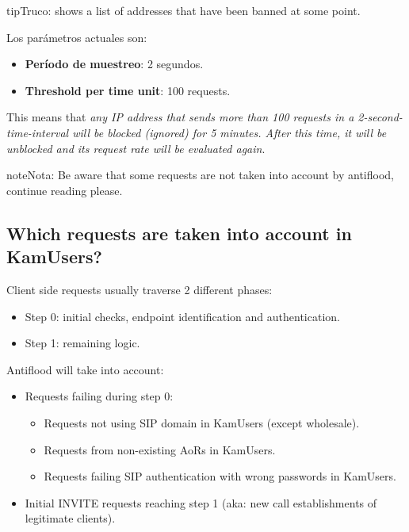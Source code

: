 \documentclass[letterpaper,10pt,spanish]{sphinxmanual}
\begin{document}
\begin{notice}{tip}{Truco:}
{\hyperref[administration_portal/platform/antiflood_banned_ips:antiflood\string-banned\string-ips]{}} shows a list of addresses that have been banned at some point.
\end{notice}

Los parámetros actuales son:
\begin{itemize}
\item {} 
\textbf{Período de muestreo}: 2 segundos.

\item {} 
\textbf{Threshold per time unit}: 100 requests.

\end{itemize}

This means that \emph{any IP address that sends more than 100 requests in a 2-second-time-interval will be blocked (ignored)
for 5 minutes. After this time, it will be unblocked and its request rate will be evaluated again}.

\begin{notice}{note}{Nota:}
Be aware that some requests are not taken into account by antiflood, continue reading please.
\end{notice}


\subsection{Which requests are taken into account in KamUsers?}
\label{security_and_maintenance/security/antiflooding:which-requests-are-taken-into-account-in-kamusers}
Client side requests usually traverse 2 different phases:
\begin{itemize}
\item {} 
Step 0: initial checks, endpoint identification and authentication.

\item {} 
Step 1: remaining logic.

\end{itemize}

Antiflood will take into account:
\begin{itemize}
\item {} 
Requests failing during step 0:
\begin{itemize}
\item {} 
Requests not using SIP domain in KamUsers (except wholesale).

\item {} 
Requests from non-existing AoRs in KamUsers.

\item {} 
Requests failing SIP authentication with wrong passwords in KamUsers.

\end{itemize}

\item {} 
Initial INVITE requests reaching step 1 (aka: new call establishments of legitimate clients).

\end{itemize}
\end{document}
